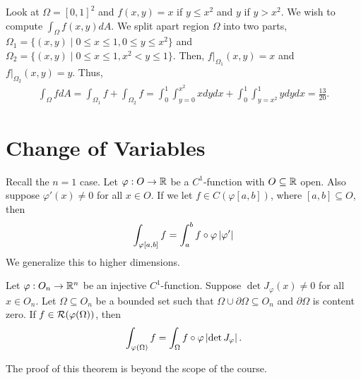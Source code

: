 \begin{example}
    Look at $\Omega = [0,1]^{2}$ and $f(x,y) = x$ if $y \leq x^{2}$ and $y$ if $y > x^{2}$. We wish to compute $\int_{\Omega} f(x,y) dA$. We split apart region $\Omega$ into two parts, $\Omega_{1} = \{(x,y) \mid 0 \leq x \leq 1, 0 \leq y \leq x^{2}\}$ and $\Omega_{2} = \{(x,y) \mid 0 \leq x \leq 1, x^{2} < y \leq 1\}$. Then, $f|_{\Omega_{1}}(x,y) = x$ and $f|_{\Omega_{2}}(x,y) = y$. Thus,
    \begin{align}
        \int_{\Omega} f dA = \int_{\Omega_{1}} f + \int_{\Omega_{2}} f = \int_{0}^{1} \int_{y=0}^{x^{2}} x dy dx + \int_{0}^{1} \int_{y=x^{2}}^{1} y dy dx = \frac{13}{20}.
    \end{align}
\end{example}

\section{Change of Variables}

Recall the $n = 1$ case. Let $\varphi: O \to \mathbb{R}$ be a $C^{1}$-function with $O \subseteq \mathbb{R}$ open. Also suppose $\varphi'(x) \neq 0$ for all $x \in O$. If we let $f \in C(\varphi[a,b])$, where $[a,b] \subseteq O$, then
\begin{align}
    \int_{\varphi[a,b]} f = \int_{a}^{b} f \circ \varphi \left| \varphi' \right|
\end{align}
We generalize this to higher dimensions.

\begin{theorem}
    Let $\varphi:O_{n} \to \mathbb{R}^{n}$ be an injective $C^{1}$-function. Suppose $\det J_{\varphi}(x) \neq 0$ for all $x \in O_{n}$. Let $\Omega \subseteq O_{n}$ be a bounded set such that $\Omega \cup \partial \Omega \subseteq O_{n}$ and $\partial \Omega$ is content zero. If $f \in \mathcal{R}(\varphi(\Omega))$, then
    \begin{align}
        \int_{\varphi(\Omega)} f = \int_{\Omega} f \circ \varphi \left| \det J_{\varphi} \right|.
    \end{align}
\end{theorem}
The proof of this theorem is beyond the scope of the course.

